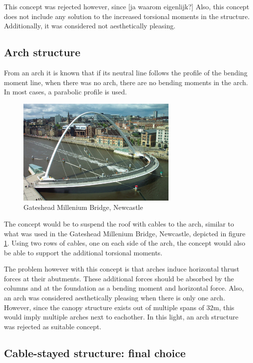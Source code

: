 \documentclass[a4paper]{article}
\begin{document}
This concept was rejected however, since [ja waarom eigenlijk?] Also, this concept does not include any solution to the increased torsional moments in the structure. Additionally, it was considered not aesthetically pleasing.

\subsection{Arch structure}

From an arch it is known that if its neutral line follows the profile of the bending moment line, when there was no arch, there are no bending moments in the arch. In most cases, a parabolic profile is used.

\begin{figure}[h]
\centering
\includegraphics[width=0.7\textwidth]{gateshead.jpg}
\caption{Gateshead Millenium Bridge, Newcastle}
\label{fig:arch}
\end{figure}

The concept would be to suspend the roof with cables to the arch, similar to what was used in the Gateshead Millenium Bridge, Newcastle, depicted in figure \ref{fig:arch}. Using two rows of cables, one on each side of the arch, the concept would also be able to support the additional torsional moments.

The problem however with this concept is that arches induce horizontal thrust forces at their abutments. These additional forces should be absorbed by the columns and at the foundation as a bending moment and horizontal force. Also, an arch was considered aesthetically pleasing when there is only one arch. However, since the canopy structure exists out of multiple spans of $32$m, this would imply multiple arches next to eachother. In this light, an arch structure was rejected as suitable concept.

\subsection{Cable-stayed structure: final choice}
\end{document}
